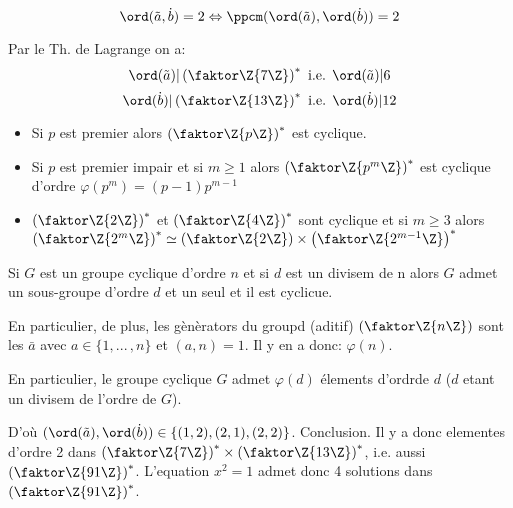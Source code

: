 $$\ord(\tilde a, \dot b)=2\Leftrightarrow \ppcm(\ord(\tilde a),\ord(\dot b))=2$$

Par le Th. de Lagrange on a:
$$ \ord(\tilde a)|\left(\faktor\Z{7\Z}\right)^\ast\mbox{ i.e. } \ord(\tilde a)|6$$
$$\ord(\dot b) | \left(\faktor\Z{13\Z}\right)^\ast \mbox{ i.e. } \ord(\dot b) | 12$$

\begin{rappel}
	\begin{itemize}
		\item Si $p$ est premier alors $\left(\faktor\Z{p\Z}\right)^\ast$ est cyclique.
		\item Si $p$ est  premier impair et si $m\geq 1$ alors $\left(\faktor\Z{p^m\Z}\right)^\ast$ est cyclique d'ordre $\varphi (p^m)=(p-1)p^{m-1}$
		\item $\left(\faktor\Z{2\Z}\right)^\ast$ et $\left(\faktor\Z{4\Z}\right)^\ast$ sont cyclique et si $m\geq 3$ alors $\left(\faktor\Z{2^m\Z}\right)^\ast\simeq\left(\faktor\Z{2\Z}\right)\times \left(\faktor\Z{2^{m-1}\Z}\right)^\ast$
	\end{itemize}
	Si $G$ est un groupe cyclique d'ordre $n$ et si $d$ est un divisem de n alors $G$ admet un sous-groupe d'ordre $d$ et un seul et il est cyclicue.
	
	En particulier, de plus, les gènèrators du groupd (aditif) $\left(\faktor\Z{n\Z}\right)$ sont les $\bar a$ avec $a\in\{1,...\,,n\}$ et $(a,n)=1$. Il y en a donc: $\varphi (n)$.
	
	En particulier, le groupe cyclique $G$ admet $\varphi (d)$ élements d'ordrde $d$ ($d$ etant un divisem de l'ordre de $G$).
\end{rappel}

D'où $(\ord(\tilde a),\ord(\dot b))\in \{(1,2),(2,1),(2,2)\}$. Conclusion. Il y a donc  elementes d'ordre 2 dans $\left( \faktor\Z{7\Z} \right)^\ast \times \left( \faktor\Z{13\Z} \right)^\ast$, i.e. aussi $\left(\faktor\Z{91\Z}\right)^\ast$. L'equation $x^2=1$ admet donc 4 solutions dans $\left(\faktor\Z{91\Z}\right)^\ast$.

